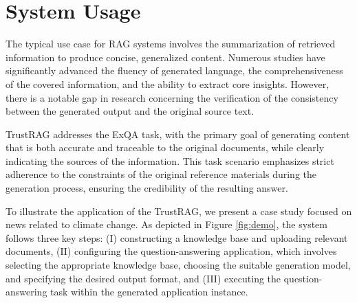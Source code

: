 \section{System Usage}
The typical use case for \ac{RAG} systems involves the summarization of retrieved information to produce concise, generalized content. Numerous studies have significantly advanced the fluency of generated language, the comprehensiveness of the covered information, and the ability to extract core insights. However, there is a notable gap in research concerning the verification of the consistency between the generated output and the original source text.

TrustRAG addresses the ExQA task, with the primary goal of generating content that is both accurate and traceable to the original documents, while clearly indicating the sources of the information. This task scenario emphasizes strict adherence to the constraints of the original reference materials during the generation process, ensuring the credibility of the resulting answer. 

To illustrate the application of the TrustRAG, we present a case study focused on news related to climate change. As depicted in Figure \ref{fig:demo}, the system follows three key steps: (I) constructing a knowledge base and uploading relevant documents, (II) configuring the question-answering application, which involves selecting the appropriate knowledge base, choosing the suitable generation model, and specifying the desired output format, and (III) executing the question-answering task within the generated application instance.

